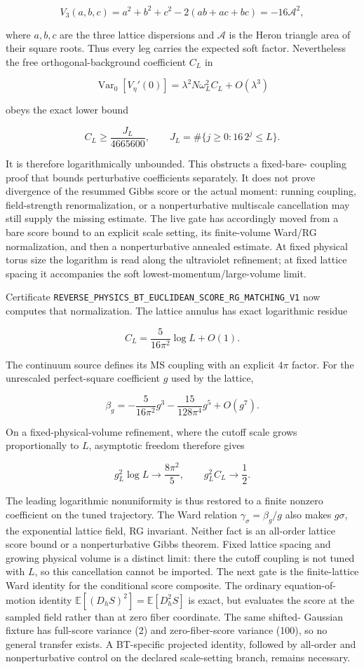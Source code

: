 \documentclass[11pt]{article}
\theoremstyle{definition}
\theoremstyle{remark}
\newcommand{\cert}[1]{\nolinkurl{#1}}
\begin{document}
\[
 V_3(a,b,c)=a^2+b^2+c^2-2(ab+ac+bc)=-16\mathcal A^2,
\]

where $a,b,c$ are the three lattice dispersions and $\mathcal A$ is the
Heron triangle area of their square roots.  Thus every leg carries the
expected soft factor.  Nevertheless the free orthogonal-background
coefficient $C_L$ in

\[
 \operatorname{Var}_0[V_\eta'(0)]
 =\lambda^2N\omega_L^2C_L+O(\lambda^3)
\]

obeys the exact lower bound

\[
 C_L\geq\frac{J_L}{4665600},\qquad
 J_L=\#\{j\geq0:16\,2^j\leq L\}.
\]

It is therefore logarithmically unbounded.  This obstructs a fixed-bare-
coupling proof that bounds perturbative coefficients separately.  It does
not prove divergence of the resummed Gibbs score or the actual moment:
running coupling, field-strength renormalization, or a nonperturbative
multiscale cancellation may still supply the missing estimate.  The live
gate has accordingly moved from a bare score bound to an explicit scale
setting, its finite-volume Ward/RG normalization, and then a nonperturbative
annealed estimate.  At fixed physical torus size the logarithm is read along
the ultraviolet refinement; at fixed lattice spacing it accompanies the
soft lowest-momentum/large-volume limit.

Certificate
\cert{REVERSE_PHYSICS_BT_EUCLIDEAN_SCORE_RG_MATCHING_V1}
now computes that normalization.  The lattice annulus has exact logarithmic
residue

\[
 C_L=\frac{5}{16\pi^2}\log L+O(1).
\]

The continuum source defines its MS coupling with an explicit $4\pi$ factor.
For the unrescaled perfect-square coefficient $g$ used by the lattice,

\[
 \beta_g=-\frac{5}{16\pi^2}g^3
          -\frac{15}{128\pi^4}g^5+O(g^7).
\]

On a fixed-physical-volume refinement, where the cutoff scale grows
proportionally to $L$, asymptotic freedom therefore gives

\[
 g_L^2\log L\longrightarrow\frac{8\pi^2}{5},
 \qquad g_L^2C_L\longrightarrow\frac12.
\]

The leading logarithmic nonuniformity is thus restored to a finite nonzero
coefficient on the tuned trajectory.  The Ward relation
$\gamma_\sigma=\beta_g/g$ also makes $g\sigma$, the exponential lattice
field, RG invariant.  Neither fact is an all-order lattice score bound or a
nonperturbative Gibbs theorem.  Fixed lattice spacing and growing physical
volume is a distinct limit: there the cutoff coupling is not tuned with $L$,
so this cancellation cannot be imported.  The next gate is the finite-lattice
Ward identity for the conditional score composite.  The ordinary
equation-of-motion identity
$\mathbb E[(D_hS)^2]=\mathbb E[D_h^2S]$ is exact, but evaluates the score at
the sampled field rather than at zero fiber coordinate.  The same shifted-
Gaussian fixture has full-score variance (2) and zero-fiber-score variance
(100), so no general transfer exists.  A BT-specific projected identity,
followed by all-order and nonperturbative control on the declared
scale-setting branch, remains necessary.
\end{document}
